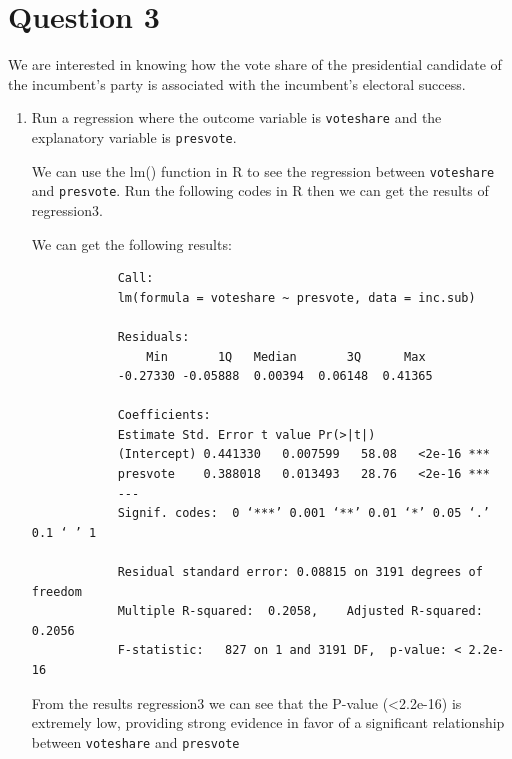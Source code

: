 \documentclass[12pt,letterpaper]{article}
\begin{document}
	\newpage
\section*{Question 3}

\noindent We are interested in knowing how the vote share of the presidential candidate of the incumbent's party is associated with the incumbent's electoral success.
	\vspace{.25cm}
	\begin{enumerate}
		\item Run a regression where the outcome variable is \texttt{voteshare} and the explanatory variable is \texttt{presvote}.
			\vspace{.15cm}
			
		 \noindent  We can use the lm() function in R to see the regression between \texttt{voteshare} and \texttt{presvote}. Run the following codes in R then we can get the results of regression3.	\vspace{.15cm}
		
		
		
		\noindent We can get the following results: \vspace{.15cm}
		\begin{verbatim}
			Call:
			lm(formula = voteshare ~ presvote, data = inc.sub)
			
			Residuals: 
			    Min       1Q   Median       3Q      Max 
		    -0.27330 -0.05888  0.00394  0.06148  0.41365 
		
		    Coefficients:            
		    Estimate Std. Error t value Pr(>|t|)    
		    (Intercept) 0.441330   0.007599   58.08   <2e-16 ***
		    presvote    0.388018   0.013493   28.76   <2e-16 ***
		    ---
		    Signif. codes:  0 ‘***’ 0.001 ‘**’ 0.01 ‘*’ 0.05 ‘.’ 0.1 ‘ ’ 1
		    
		    Residual standard error: 0.08815 on 3191 degrees of freedom
		    Multiple R-squared:  0.2058,	Adjusted R-squared:  0.2056 
		    F-statistic:   827 on 1 and 3191 DF,  p-value: < 2.2e-16
		\end{verbatim}
		\vspace{.15cm}
		
		\noindent From the results regression3 we can see that the P-value (\textless 2.2e-16) is extremely low, providing strong evidence in favor of a significant relationship between \texttt{voteshare} and \texttt{presvote}\\ \vspace{.15cm}
			

\end{enumerate}
\end{document}
